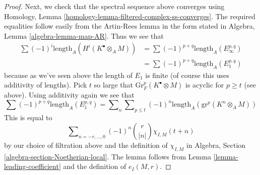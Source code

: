 \documentclass[10pt,a4paper]{amsart}
\theoremstyle{plain}
\theoremstyle{definition}
\theoremstyle{remark}
\numberwithin{equation}{subsection}
\begin{document}
\begin{proof}
\medskip\noindent
Next, we check that the spectral sequence above converges
using Homology, Lemma \ref{homology-lemma-filtered-complex-ss-converges}.
The required equalities follow easily from the Artin-Rees lemma
in the form stated in Algebra, Lemma \ref{algebra-lemma-map-AR}.
Thus we see that
\begin{align*}
\sum (-1)^i\text{length}_A(H^i(K^\bullet \otimes_A M))
& =
\sum (-1)^{p + q} \text{length}_A(E_\infty^{p, q}) \\
& =
\sum (-1)^{p + q} \text{length}_A(E_1^{p, q})
\end{align*}
because as we've seen above the length of $E_1$ is finite
(of course this uses additivity of lengths). Pick $t$ so
large that $\text{Gr}^p_F(K^\bullet \otimes M)$
is acyclic for $p \geq t$ (see above). Using
additivity again we see that
$$
\sum (-1)^{p + q} \text{length}_A(E_1^{p, q}) =
\sum\nolimits_n \sum\nolimits_{p \leq t}
(-1)^n \text{length}_A(\text{gr}^p(K^n \otimes_A M))
$$
This is equal to
$$
\sum\nolimits_{n = -r, \ldots, 0} (-1)^n{r \choose |n|} \chi_{I, M}(t + n)
$$
by our choice of filtration above and the definition of $\chi_{I, M}$ in
Algebra, Section \ref{algebra-section-Noetherian-local}.
The lemma follows from Lemma \ref{lemma-leading-coefficient}
and the definition of $e_I(M, r)$.
\end{proof}



\end{document}
